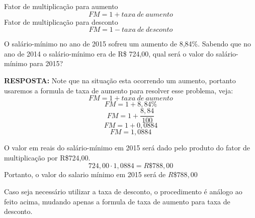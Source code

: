 \begin{center}
    Fator de multiplicação para aumento
    $$FM=1+taxa~de~aumento$$
    Fator de multiplicação para desconto
    $$FM=1-taxa~de~desconto$$
\end{center}
\begin{example}
    O salário-mínimo no ano de 2015 sofreu um aumento de 8,84\%. Sabendo que no ano de 2014 o salário-mínimo era de R\$ 724,00, qual será o valor do salário-mínimo para 2015?
\end{example}

\textbf{RESPOSTA:} Note que na situação esta ocorrendo um aumento, portanto usaremos a formula de taxa de aumento para resolver esse problema, veja:
$$FM=1+taxa~de~aumento$$
$$FM=1+8,84\%$$
$$FM=1+\frac{8,84}{100}$$
$$FM=1+0,0884$$
$$FM=1,0884$$

O valor em reais do salário-mínimo em 2015 será dado pelo produto do fator de multiplicação por R\$724,00.
$$ 724,00 \cdot 1,0884 = R\$ 788,00$$
Portanto, o valor do salario mínimo em 2015 será de $R\$788,00$


\begin{obs}
Caso seja necessário utilizar a taxa de desconto, o procedimento é análogo ao feito acima, mudando apenas a formula de taxa de aumento para taxa de desconto.
\end{obs}


